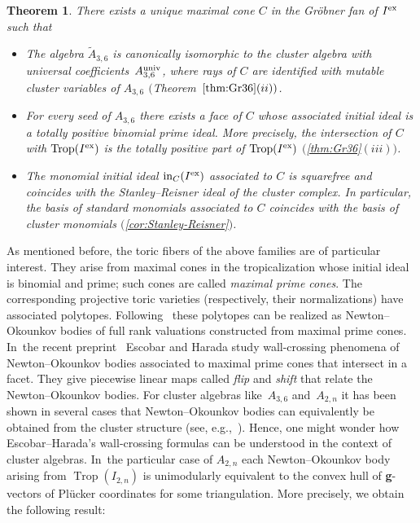 \documentclass[10pt,a4paper]{amsart}
\newcommand{\thref}[1]{\ref{#1}}
\newtheorem{Theorem}{Theorem}[section]
\numberwithin{equation}{section}
\DeclareMathOperator{\init}{in}
\DeclareMathOperator{\trop}{Trop}
\begin{document}
\begin{Theorem}%
There exists a unique maximal cone $C$ in the Gr\"obner fan of $I^{\rm ex}$ such that
\begin{itemize}\itemsep=0pt
 \item[$(i)$] The algebra $\tilde A_{3,6}$ is canonically isomorphic to the cluster algebra with universal coeffici\-ents~$A^{\rm univ}_{3,6}$, where rays of $C$ are identified with mutable cluster variables of $A_{3,6}$ $($Theo\-rem~$\ref{thm:Gr36}(ii))$.
 \item[$(ii)$] For every seed of $A_{3,6}$ there exists a face of $C$ whose associated initial ideal is a totally positive binomial prime ideal. More precisely, the intersection of $C$ with $\trop(I^{\rm ex})$ is the totally positive part of $\trop(I^{\rm ex})$ $($\thref{thm:Gr36}$(iii))$.
 \item[$(iii)$] The monomial initial ideal $\init_C(I^{\rm ex})$ associated to $C$ is squarefree and coincides with the Stanley--Reisner ideal of the cluster complex. In particular, the basis of standard monomials associated to $C$ coincides with the basis of cluster monomials $($\thref{cor:Stanley-Reisner}$)$.
\end{itemize}
\end{Theorem}

As mentioned before, the toric fibers of the above families are of particular interest.
They arise from maximal cones in the tropicalization whose initial ideal is binomial and prime; such cones are called {\it maximal prime cones}.
The corresponding projective toric varieties (respectively, their normalizations) have associated polytopes.
Following~\cite{KM16} these polytopes can be realized as Newton--Okounkov bodies of full rank valuations constructed from maximal prime cones.
In~the recent preprint~\cite{EH-NObodies} Escobar and Harada study wall-crossing phenomena of Newton--Okounkov bodies associated to maximal prime cones that intersect in a facet.
They give piecewise linear maps called {\it flip} and {\it shift} that relate the Newton--Okounkov bodies.
For cluster algebras like~$A_{3,6}$ and~$A_{2,n}$ it has been shown in several cases that Newton--Okounkov bodies can equivalently be obtained from the cluster structure (see, e.g.,~\cite{BCMN,BF19,FO20,RW17}).
Hence, one might wonder how Escobar--Harada's wall-crossing formulas can be understood in the context of cluster algebras.
In~the particular case of $A_{2,n}$ each Newton--Okounkov body arising from $\trop(I_{2,n})$ is unimodularly equivalent to the convex hull of {\bf g}-vectors of Pl\"ucker coordinates for some triangulation.
More precisely, we obtain the following result:
\end{document}
